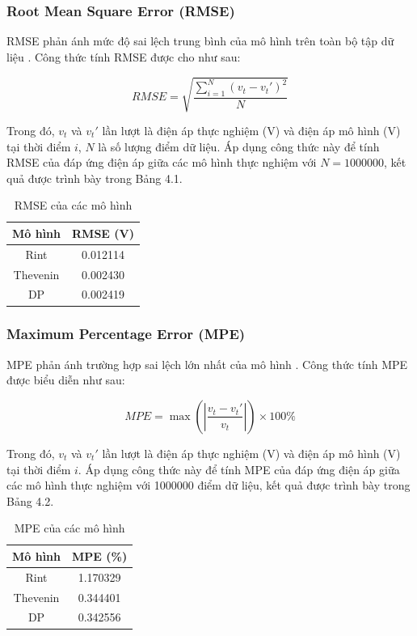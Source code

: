 \documentclass{thesis}
\begin{document}
    \subsubsection{Root Mean Square Error (RMSE)}
    RMSE phản ánh mức độ sai lệch trung bình của mô hình trên toàn bộ tập dữ liệu \cite{nemes2019}. Công thức tính RMSE được cho như sau:

\begin{equation}
RMSE = \sqrt{\frac{\sum_{i=1}^{N} (v_t - v_t')^2}{N}}
\end{equation}

Trong đó, \( v_t \) và \( v_t' \) lần lượt là điện áp thực nghiệm (V) và điện áp mô hình (V) tại thời điểm \( i \), \( N \) là số lượng điểm dữ liệu. Áp dụng công thức này để tính RMSE của đáp ứng điện áp giữa các mô hình thực nghiệm với \( N = 1000000 \), kết quả được trình bày trong Bảng 4.1.
\newpage
\begin{table}[h]
    \centering
    \begin{tabular}{|c|c|}
        \hline
        Mô hình & RMSE (V) \\
        \hline
        Rint & 0.012114 \\
        Thevenin & 0.002430 \\
        DP & 0.002419 \\
        \hline
    \end{tabular}
    \caption{RMSE của các mô hình}
    \label{tab:rmse}
\end{table}

\subsubsection{Maximum Percentage Error (MPE)}

MPE phản ánh trường hợp sai lệch lớn nhất của mô hình \cite{zhang2010}. Công thức tính MPE được biểu diễn như sau:

\begin{equation}
MPE = \max\left(\left|\frac{v_t - v_t'}{v_t}\right|\right) \times 100\%
\end{equation}

Trong đó, \( v_t \) và \( v_t' \) lần lượt là điện áp thực nghiệm (V) và điện áp mô hình (V) tại thời điểm \( i \). Áp dụng công thức này để tính MPE của đáp ứng điện áp giữa các mô hình thực nghiệm với 1000000 điểm dữ liệu, kết quả được trình bày trong Bảng 4.2.

\begin{table}[h]
    \centering
    \begin{tabular}{|c|c|}
        \hline
        Mô hình & MPE (\%) \\
        \hline
        Rint & 1.170329 \\
        Thevenin & 0.344401 \\
        DP & 0.342556 \\
        \hline
    \end{tabular}
    \caption{MPE của các mô hình}
    \label{tab:mpe}
\end{table}
\end{document}
